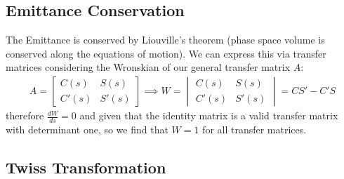 \documentclass{article}
\numberwithin{equation}{section}
\begin{document}
\subsection{Emittance Conservation}

The Emittance is conserved by Liouville's theorem (phase space volume is conserved along the equations of motion). We can express this via transfer matrices considering the Wronskian of our general transfer matrix $A$:
\begin{align}
A = \begin{bmatrix} C(s) & S(s) \\ C'(s) & S'(s)\end{bmatrix} \implies 
W = \begin{vmatrix} C(s) & S(s) \\ C'(s) & S'(s)\end{vmatrix} = CS'-C'S 
\end{align}
therefore $\frac{dW}{ds} = 0$ and given that the identity matrix is a valid transfer matrix with determinant one, so we find that $W=1$ for all transfer matrices.

\subsection{ Twiss Transformation }
\end{document}
